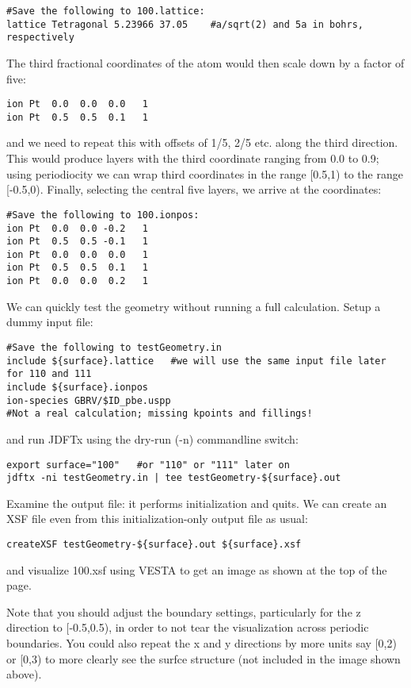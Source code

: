 \begin{verbatim}
#Save the following to 100.lattice:
lattice Tetragonal 5.23966 37.05    #a/sqrt(2) and 5a in bohrs, respectively
\end{verbatim}

The third fractional coordinates of the atom would then scale down by a factor of five:

\begin{verbatim}
ion Pt  0.0  0.0  0.0   1
ion Pt  0.5  0.5  0.1   1
\end{verbatim}

and we need to repeat this with offsets of 1/5, 2/5 etc. along the third direction.
This would produce layers with the third coordinate ranging from 0.0 to 0.9;
using periodiocity we can wrap third coordinates in the range [0.5,1) to the
range [-0.5,0). Finally, selecting the central five layers, we arrive at the coordinates:

\begin{verbatim}
#Save the following to 100.ionpos:
ion Pt  0.0  0.0 -0.2   1
ion Pt  0.5  0.5 -0.1   1
ion Pt  0.0  0.0  0.0   1
ion Pt  0.5  0.5  0.1   1
ion Pt  0.0  0.0  0.2   1
\end{verbatim}

We can quickly test the geometry without running a full calculation. Setup a dummy input file:

\begin{verbatim}
#Save the following to testGeometry.in
include ${surface}.lattice   #we will use the same input file later for 110 and 111
include ${surface}.ionpos
ion-species GBRV/$ID_pbe.uspp
#Not a real calculation; missing kpoints and fillings!
\end{verbatim}

and run JDFTx using the dry-run (-n) commandline switch:

\begin{verbatim}
export surface="100"   #or "110" or "111" later on
jdftx -ni testGeometry.in | tee testGeometry-${surface}.out
\end{verbatim}

Examine the output file: it performs initialization and quits.
We can create an XSF file even from this initialization-only output file as usual:
\begin{verbatim}
createXSF testGeometry-${surface}.out ${surface}.xsf
\end{verbatim}

and visualize 100.xsf using VESTA to get an image as shown at the top of the page.

Note that you should adjust the boundary settings, particularly for the z
direction to [-0.5,0.5), in order to not tear the visualization across periodic
boundaries. You could also repeat the x and y directions by more units say [0,2) or
[0,3) to more clearly see the surfce structure (not included in the image shown above). 